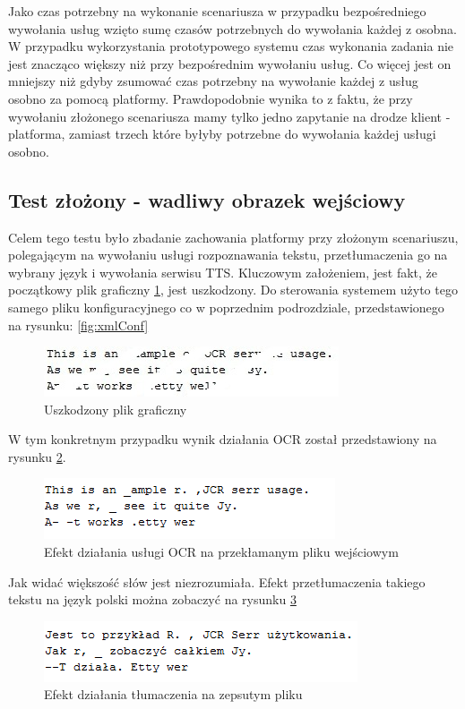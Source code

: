 Jako czas potrzebny na wykonanie scenariusza w przypadku bezpośredniego wywołania usług wzięto sumę czasów potrzebnych do wywołania każdej z osobna. W przypadku wykorzystania prototypowego systemu czas wykonania zadania nie jest znacząco większy niż przy bezpośrednim wywołaniu usług. Co więcej jest on mniejszy niż gdyby zsumować czas potrzebny na wywołanie każdej z usług osobno za pomocą platformy. Prawdopodobnie wynika to z faktu, że przy wywołaniu złożonego scenariusza mamy tylko jedno zapytanie na drodze klient - platforma, zamiast trzech które byłyby potrzebne do wywołania każdej usługi osobno.  

\subsection{Test złożony - wadliwy obrazek wejściowy}
Celem tego testu było zbadanie zachowania platformy przy złożonym scenariuszu, polegającym na wywołaniu usługi rozpoznawania tekstu, przetłumaczenia go na wybrany język i wywołania serwisu TTS. Kluczowym założeniem, jest fakt, że początkowy plik graficzny \ref{fig:uszkodzoneWejscie}, jest uszkodzony. Do sterowania systemem użyto tego samego pliku konfiguracyjnego co w poprzednim podrozdziale, przedstawionego na rysunku: \ref{fig:xmlConf}

\begin{figure}[!h]
\centering
\includegraphics[scale=0.9]{brokenOCRExample.jpg}
\caption{Uszkodzony plik graficzny}\label{fig:uszkodzoneWejscie}
\end{figure} 

 W tym konkretnym przypadku wynik działania OCR został przedstawiony na rysunku \ref{fig:zepsuteWyjscieOCR}.

\begin{figure}[!h]
\centering
\includegraphics[scale=0.9]{zepsuteWyjscieOCR.png}
\caption{Efekt działania usługi OCR na przekłamanym pliku wejściowym}\label{fig:zepsuteWyjscieOCR}
\end{figure} 

Jak widać większość słów jest niezrozumiała. Efekt przetłumaczenia takiego tekstu na język polski można zobaczyć na rysunku \ref{fig:zepsuteWyjscieTlumaczenia}
\begin{figure}[!h]
\centering
\includegraphics[scale=0.9]{zepsuteWyjscieTlumaczenia.png}
\caption{Efekt działania tłumaczenia na zepsutym pliku}\label{fig:zepsuteWyjscieTlumaczenia}
\end{figure} 

